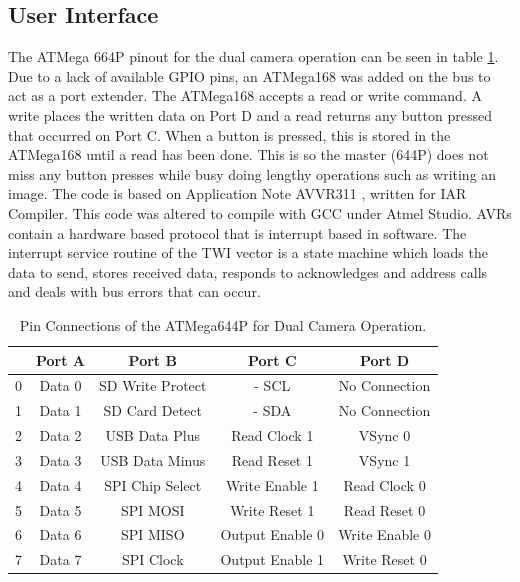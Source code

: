 \subsection{User Interface}
The ATMega 664P pinout for the dual camera operation can be seen in table \ref{table:644Pin}. Due to a lack of available GPIO pins, an ATMega168 was added on the \itc bus to act as a port extender. The ATMega168 accepts a read or write command. A write places the written data on Port D and a read returns any button pressed that occurred on Port C. When a button is pressed, this is stored in the ATMega168 until a read has been done. This is so the master (644P) does not miss any button presses while busy doing lengthy operations such as writing an image. The code is based on Application Note AVVR311 \citep{Atmel:I2CSlave}, written for IAR Compiler. This code was altered to compile with GCC under Atmel Studio. AVRs contain a hardware based \itc protocol that is interrupt based in software. The interrupt service routine of the TWI vector is a state machine which loads the data to send, stores received data, responds to acknowledges and address calls and deals with bus errors that can occur.

\begin{table}
\centering
\begin{tabular}{|c|c|c|c|c|}\hline
	& 	Port A 	& 	Port B 			& 	Port C 				& 	Port D 		\\ \hline
0	&	Data 0	&	SD Write Protect&	\itc - SCL			&	No Connection	\\
1	&	Data 1	&	SD Card Detect	&	\itc - SDA			&	No Connection	\\
2	&	Data 2	&	USB Data Plus	&	Read Clock 1		&	VSync 0			\\
3	&	Data 3	&	USB Data Minus	&	Read Reset 1		&	VSync 1			\\
4	&	Data 4	&	SPI Chip Select	&	Write Enable 1		&	Read Clock 0	\\
5	&	Data 5	&	SPI	MOSI 		&	Write Reset 1		&	Read Reset 0	\\
6	&	Data 6	&	SPI MISO		&	Output Enable 0		&	Write Enable 0	\\
7	&	Data 7	&	SPI Clock		&	Output Enable 1		&	Write Reset 0	\\
\hline

\end{tabular}
\caption{Pin Connections of the ATMega644P for Dual Camera Operation.}
\label{table:644Pin}
\end{table}

